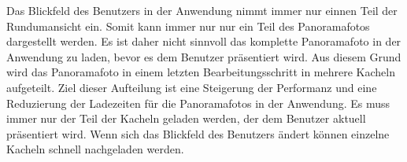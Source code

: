 Das Blickfeld des Benutzers in der Anwendung nimmt immer nur einnen Teil der
Rundumansicht ein. Somit kann immer nur nur ein Teil des Panoramafotos
dargestellt werden. Es ist daher nicht sinnvoll das komplette Panoramafoto in
der Anwendung zu laden, bevor es dem Benutzer präsentiert wird.
Aus diesem Grund wird das Panoramafoto in einem letzten Bearbeitungsschritt in
mehrere Kacheln aufgeteilt. Ziel dieser Aufteilung ist eine Steigerung der
Performanz und eine Reduzierung der Ladezeiten für die Panoramafotos in der
Anwendung. Es muss immer nur der Teil der Kacheln geladen werden, der dem
Benutzer aktuell präsentiert wird. Wenn sich das Blickfeld des Benutzers ändert
können einzelne Kacheln schnell nachgeladen werden.
